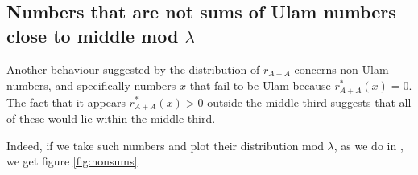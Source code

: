 \documentclass{report}
\theoremstyle{remark}
\numberwithin{equation}{section}
\begin{document}



\subsection{Numbers that are not sums of Ulam numbers close to middle mod $\lambda$}

Another behaviour suggested by the distribution of $r_{A+A}$ concerns
non-Ulam numbers, and specifically numbers $x$ that fail to be Ulam
because $r^*_{A+A}(x) = 0$.  The fact that it appears
$r^*_{A+A}(x) > 0$ outside the middle third suggests that all of these
would lie within the middle third.

Indeed, if we take such numbers and plot their distribution mod
$\lambda$, as we do in , we get figure
\ref{fig:nonsums}.
\end{document}
